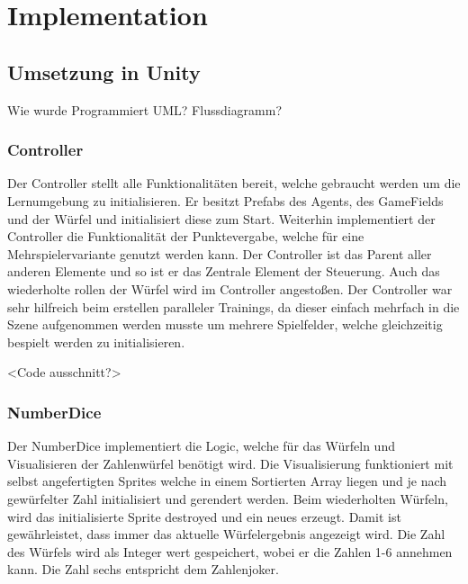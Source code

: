 

\clearpage
\chapter{Implementation}

\section{Umsetzung in Unity}
Wie wurde Programmiert
UML?
Flussdiagramm?


\subsection{Controller}
Der Controller stellt alle Funktionalitäten bereit, welche gebraucht werden um die Lernumgebung zu initialisieren.
Er besitzt Prefabs des Agents, des GameFields und der Würfel und initialisiert diese zum Start.
Weiterhin implementiert der Controller die Funktionalität der Punktevergabe, welche für eine Mehrspielervariante genutzt werden kann.
Der Controller ist das Parent aller anderen Elemente und so ist er das Zentrale Element der Steuerung. Auch das wiederholte rollen der Würfel wird im Controller angestoßen.
Der Controller war sehr hilfreich beim erstellen paralleler Trainings, da dieser einfach mehrfach in die Szene aufgenommen werden musste um mehrere Spielfelder, welche gleichzeitig bespielt werden zu initialisieren.

<Code ausschnitt?>

\subsection{NumberDice}
Der NumberDice implementiert die Logic, welche für das Würfeln und Visualisieren der Zahlenwürfel benötigt wird.
Die Visualisierung funktioniert mit selbst angefertigten Sprites welche in einem Sortierten Array liegen und je nach gewürfelter Zahl initialisiert und gerendert werden.
Beim wiederholten Würfeln, wird das initialisierte Sprite destroyed und ein neues erzeugt.
Damit ist gewährleistet, dass immer das aktuelle Würfelergebnis angezeigt wird.
Die Zahl des Würfels wird als Integer wert gespeichert, wobei er die Zahlen 1-6 annehmen kann.
Die Zahl sechs entspricht dem Zahlenjoker.

